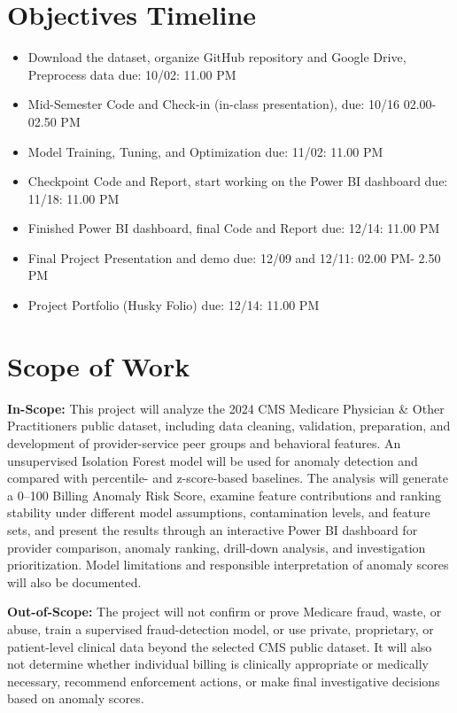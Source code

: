 \documentclass[12pt]{article}
\begin{document}
\section{Objectives Timeline}
\begin{itemize}[leftmargin=*]
\item[1)] Download the dataset, organize GitHub repository and Google Drive, Preprocess data due: 10/02: 11.00 PM
\item[2)] Mid-Semester Code and Check-in (in-class presentation), due: 10/16 02.00-02.50 PM
\item[3)] Model Training, Tuning, and Optimization due: 11/02: 11.00 PM
\item[4)] Checkpoint Code and Report, start working on the Power BI dashboard due: 11/18: 11.00 PM
\item[5)] Finished Power BI dashboard, final Code and Report due: 12/14: 11.00 PM
\item[6)] Final Project Presentation and demo due: 12/09 and 12/11: 02.00 PM- 2.50 PM 
\item[7)] Project Portfolio (Husky Folio) due: 12/14: 11.00 PM
\end{itemize}

\section{Scope of Work}

\textbf{In-Scope:} This project will analyze the 2024 CMS Medicare Physician \& Other Practitioners public dataset, including data cleaning, validation, preparation, and development of provider-service peer groups and behavioral features. An unsupervised Isolation Forest model will be used for anomaly detection and compared with percentile- and z-score-based baselines. The analysis will generate a 0--100 Billing Anomaly Risk Score, examine feature contributions and ranking stability under different model assumptions, contamination levels, and feature sets, and present the results through an interactive Power BI dashboard for provider comparison, anomaly ranking, drill-down analysis, and investigation prioritization. Model limitations and responsible interpretation of anomaly scores will also be documented.

\textbf{Out-of-Scope:} The project will not confirm or prove Medicare fraud, waste, or abuse, train a supervised fraud-detection model, or use private, proprietary, or patient-level clinical data beyond the selected CMS public dataset. It will also not determine whether individual billing is clinically appropriate or medically necessary, recommend enforcement actions, or make final investigative decisions based on anomaly scores.
\end{document}
